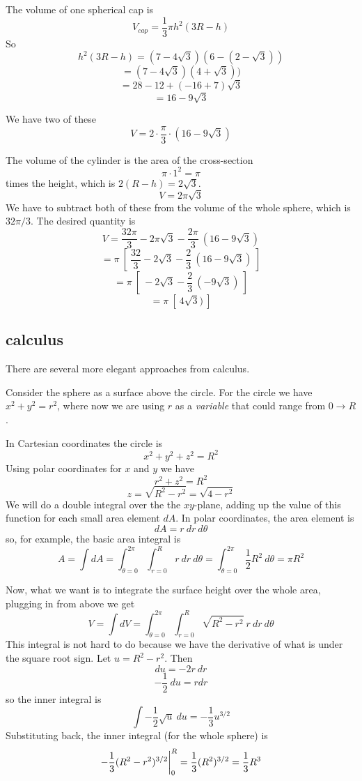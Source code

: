 \documentclass[11pt, oneside]{article}
\begin{document}
The volume of one spherical cap is
\[ V_{cap} = \frac{1}{3} \pi h^2(3R - h) \]
So 
\[ h^2(3R - h) = (7- 4 \sqrt{3})(6-(2-\sqrt{3})) \]
\[ = (7- 4 \sqrt{3})(4 + \sqrt{3})) \]
\[ = 28 - 12 + (-16 + 7) \sqrt{3} \]
\[ = 16 - 9 \sqrt{3} \]

We have two of these
\[ V = 2 \cdot \frac{\pi}{3} \cdot (16 - 9 \sqrt{3}) \]

The volume of the cylinder is the area of the cross-section
\[ \pi \cdot 1^2 = \pi \]
 times the height, which is $2(R-h) = 2 \sqrt{3}$.
\[ V = 2 \pi \sqrt{3} \]
We have to subtract both of these from the volume of the whole sphere, which is $32 \pi/3$.  The desired quantity is
\[ V = \frac{32 \pi}{3} - 2 \pi \sqrt{3} - \frac{2\pi}{3} \ (16 - 9 \sqrt{3}) \]
\[ = \pi \ [ \ \frac{32}{3} - 2 \sqrt{3} - \frac{2}{3} \ (16 - 9 \sqrt{3}) \ ] \]
\[ = \pi \ [ \ - 2 \sqrt{3} - \frac{2}{3} \ ( - 9 \sqrt{3}) \ ] \]
\[ = \pi \ [ \ 4 \sqrt{3}) \ ] \]

\subsection*{calculus}

There are several more elegant approaches from calculus.  

Consider the sphere as a surface above the circle.  For the circle we have $x^2 + y^2 = r^2$, where now we are using $r$ as a \emph{variable} that could range from $0 \rightarrow R$.

In Cartesian coordinates the circle is
\[ x^2 + y^2 + z^2 = R^2 \]
Using polar coordinates for $x$ and $y$ we have 
\[ r^2 + z^2 = R^2 \]
\[ z = \sqrt{R^2 - r^2} = \sqrt{4 - r^2}  \]
We will do a double integral over the the $xy$-plane, adding up the value of this function for each small area element $dA$.  In polar coordinates, the area element is
\[ dA = r \ dr \ d \theta \]
so, for example, the basic area integral is
\[ A = \int dA = \int_{\theta=0}^{2 \pi} \int_{r=0}^R r \ dr \ d \theta = \int_{\theta=0}^{2 \pi} \frac{1}{2}R^2 \ d \theta = \pi R^2 \]

Now, what we want is to integrate the surface height over the whole area, plugging in from above we get
\[ V = \int dV = \int_{\theta=0}^{2 \pi} \int_{r=0}^R \sqrt{R^2 - r^2}  \ r \ dr \ d \theta \]
This integral is not hard to do because we have the derivative of what is under the square root sign.  Let $u = R^2 - r^2$.  Then
\[ du = -2r \ dr \]
\[ -\frac{1}{2} \ du = r dr \]
so the inner integral is
\[ \int -\frac{1}{2} \sqrt{u} \  du = -\frac{1}{3} u^{3/2} \]
Substituting back, the inner integral (for the whole sphere) is 
\[ -\frac{1}{3} (R^2 -r^2)^{3/2} \bigg{|}_0^R = \frac{1}{3}(R^2)^{3/2} =  \frac{1}{3} R^3 \]
\end{document}
